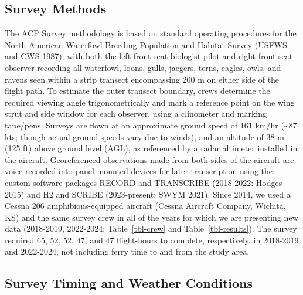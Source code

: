 \documentclass[
]{article}
\begin{document}
\subsection*{Survey Methods}\label{survey-methods}

The ACP Survey methodology is based on standard operating procedures for
the North American Waterfowl Breeding Population and Habitat Survey
(USFWS and CWS 1987), with both the left-front seat biologist-pilot and
right-front seat observer recording all waterfowl, loons, gulls,
jaegers, terns, eagles, owls, and ravens seen within a strip transect
encompassing 200 m on either side of the flight path. To estimate the
outer transect boundary, crews determine the required viewing angle
trigonometrically and mark a reference point on the wing strut and side
window for each observer, using a clinometer and marking tape/pens.
Surveys are flown at an approximate ground speed of 161 km/hr
(\textasciitilde87 kts; though actual ground speeds vary due to winds),
and an altitude of 38 m (125 ft) above ground level (AGL), as referenced
by a radar altimeter installed in the aircraft. Georeferenced
observations made from both sides of the aircraft are voice-recorded
into panel-mounted devices for later transcription using the custom
software packages RECORD and TRANSCRIBE (2018-2022: Hodges 2015) and H2
and SCRIBE (2023-present: SWYM 2021). Since 2014, we used a Cessna 206
amphibious-equipped aircraft (Cessna Aircraft Company, Wichita, KS) and
the same survey crew in all of the years for which we are presenting new
data (2018-2019, 2022-2024; Table~\ref{tbl-crew} and
Table~\ref{tbl-results}). The survey required 65, 52, 52, 47, and 47
flight-hours to complete, respectively, in 2018-2019 and 2022-2024, not
including ferry time to and from the study area.

\subsection*{Survey Timing and Weather
Conditions}\label{survey-timing-and-weather-conditions}
\end{document}

